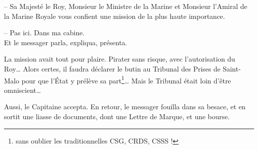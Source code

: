 -- Sa Majesté le Roy, Monsieur le Ministre de la Marine et Monsieur
   l'Amiral de la Marine Royale vous confient une mission de la plus
   haute importance.

-- Pas ici. Dans ma cabine.\\

Et le messager parla, expliqua, présenta.

La mission avait tout pour plaire. Pirater sans risque, avec
l'autorisation du Roy\ldots{} Alors certes, il faudra déclarer le
butin au Tribunal des Prises de Saint-Malo pour que l'État y prélève
sa part\footnote{sans oublier les traditionnelles CSG, CRDS, CSSS
!}\ldots{} Mais le Tribunal était loin d'être omniscient\ldots{}

Aussi, le Capitaine accepta. En retour, le messager fouilla dans sa
besace, et en sortit une liasse de documents, dont une Lettre de
Marque, et une bourse.\\
\newpage
